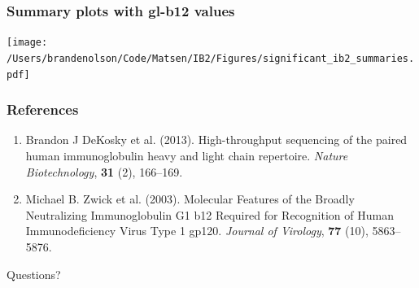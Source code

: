 \documentclass[mathserif,compress]{beamer}
\renewcommand\;{\,}
\begin{document}
\begin{frame}\frametitle{Summary plots with gl-b12 values}
\begin{center}
\texttt{[image: /Users/brandenolson/Code/Matsen/IB2/Figures/significant\_ib2\_summaries.pdf]}
\end{center}
\end{frame}


\begin{frame}\frametitle{References}
\begin{enumerate}
\item
Brandon J DeKosky et al. (2013).
High-throughput sequencing of the paired human
immunoglobulin heavy and light chain repertoire.
\emph{Nature Biotechnology}, \textbf{31} (2), 166--169.
\bigskip
\item
Michael B. Zwick et al. (2003).
Molecular Features of the Broadly Neutralizing Immunoglobulin G1 b12 Required for Recognition of Human Immunodeficiency Virus Type 1 gp120.
\emph{Journal of Virology}, \textbf{77} (10), 5863--5876.
\end{enumerate}
\end{frame}


\begin{frame}
\begin{center}
\Huge
Questions?
\end{center}
\end{frame}
\end{document}
